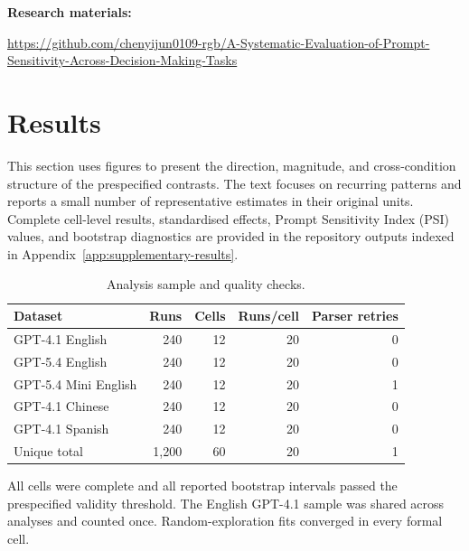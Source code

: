 \documentclass[logo,msc,inf]{infthesis}       %
\begin{document}
\noindent\textbf{Research materials:}\par
\begingroup
\raggedright
{}
\sloppy
\url{https://github.com/chenyijun0109-rgb/A-Systematic-Evaluation-of-Prompt-Sensitivity-Across-Decision-Making-Tasks}
\par
\endgroup

\chapter{Results}
\label{sec:results}

This section uses figures to present the direction, magnitude, and cross-condition structure of the prespecified contrasts. The text focuses on recurring patterns and reports a small number of representative estimates in their original units. Complete cell-level results, standardised effects, Prompt Sensitivity Index (PSI) values, and bootstrap diagnostics are provided in the repository outputs indexed in Appendix~\ref{app:supplementary-results}.


\begin{table}[htbp]
\centering
\caption{Analysis sample and quality checks.}
\label{tab:results_quality}
\begin{tabular}{@{}lrrrr@{}}
\toprule
Dataset & Runs & Cells & Runs/cell & Parser retries \\
\midrule
GPT-4.1 English & 240 & 12 & 20 & 0 \\
GPT-5.4 English & 240 & 12 & 20 & 0 \\
GPT-5.4 Mini English & 240 & 12 & 20 & 1 \\
GPT-4.1 Chinese & 240 & 12 & 20 & 0 \\
GPT-4.1 Spanish & 240 & 12 & 20 & 0 \\
\midrule
Unique total & 1,200 & 60 & 20 & 1 \\
\bottomrule
\end{tabular}
\begin{flushleft}
All cells were complete and all reported bootstrap intervals passed the prespecified validity threshold. The English GPT-4.1 sample was shared across analyses and counted once. Random-exploration fits converged in every formal cell.
\end{flushleft}
\end{table}
\end{document}
